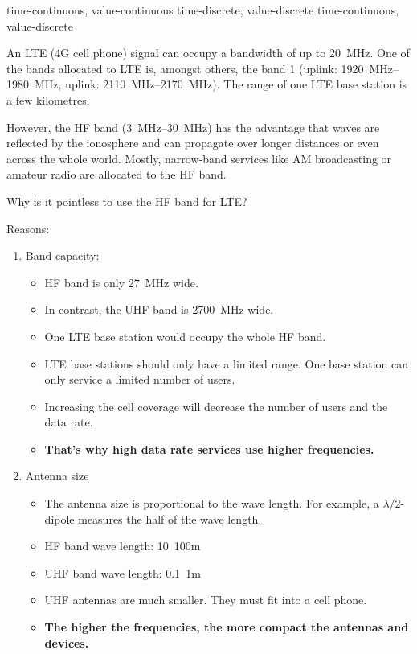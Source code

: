 \begin{solution}
	\begin{tasks}
		\task
		time-continuous, value-continuous
		\task
		time-discrete, value-discrete
		\task
		time-continuous, value-discrete
	\end{tasks}
\end{solution}

\begin{question}[subtitle={Frequency Allocation}]
	An LTE (4G cell phone) signal can occupy a bandwidth of up to \SI{20}{MHz}. One of the bands allocated to LTE is, amongst others, the band 1 (uplink: \SIrange{1920}{1980}{MHz}, uplink: \SIrange{2110}{2170}{MHz}). The range of one LTE base station is a few kilometres.
	
	However, the HF band (\SIrange{3}{30}{MHz}) has the advantage that waves are reflected by the ionosphere and can propagate over longer distances or even across the whole world. Mostly, narrow-band services like AM broadcasting or amateur radio are allocated to the HF band.
	
	Why is it pointless to use the HF band for LTE?
\end{question}

\begin{solution}
	Reasons:
	\begin{enumerate}
		\item Band capacity:
		\begin{itemize}
			\item HF band is only \SI{27}{MHz} wide.
			\item In contrast, the UHF band is \SI{2700}{MHz} wide.
			\item One LTE base station would occupy the whole HF band.
			\item LTE base stations should only have a limited range. One base station can only service a limited number of users.
			\item Increasing the cell coverage will decrease the number of users and the data rate.
			\item \textbf{That's why high data rate services use higher frequencies.}
		\end{itemize}
		\item Antenna size
		\begin{itemize}
			\item The antenna size is proportional to the wave length. For example, a $\lambda/2$-dipole measures the half of the wave length.
			\item HF band wave length: \SI{10}{100}{m}
			\item UHF band wave length: \SI{0.1}{1}{m}
			\item UHF antennas are much smaller. They must fit into a cell phone.
			\item \textbf{The higher the frequencies, the more compact the antennas and devices.}
		\end{itemize}
	\end{enumerate}
\end{solution}

